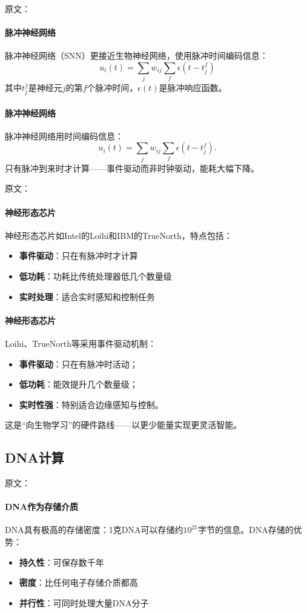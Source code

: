 原文：
\paragraph{脉冲神经网络}
脉冲神经网络（SNN）更接近生物神经网络，使用脉冲时间编码信息：
$$u_i(t) = \sum_j w_{ij} \sum_f \epsilon(t - t_j^f)$$
其中$t_j^f$是神经元$j$的第$f$个脉冲时间，$\epsilon(t)$是脉冲响应函数。
\paragraph{脉冲神经网络}
脉冲神经网络用时间编码信息：
$$u_i(t)=\sum_jw_{ij}\sum_f\epsilon(t-t_j^f).$$
只有脉冲到来时才计算——\;事件驱动而非时钟驱动，能耗大幅下降。

原文：
\paragraph{神经形态芯片}
神经形态芯片如Intel的Loihi和IBM的TrueNorth，特点包括：
\begin{itemize}
\item \textbf{事件驱动}：只在有脉冲时才计算
\item \textbf{低功耗}：功耗比传统处理器低几个数量级
\item \textbf{实时处理}：适合实时感知和控制任务
\end{itemize}
\paragraph{神经形态芯片}
Loihi、TrueNorth等采用事件驱动机制：  
\begin{itemize}
\item \textbf{事件驱动}：只在有脉冲时活动；
\item \textbf{低功耗}：能效提升几个数量级；
\item \textbf{实时性强}：特别适合边缘感知与控制。
\end{itemize}
这是“向生物学习”的硬件路线——\;以更少能量实现更灵活智能。

\subsection{DNA计算}

原文：
\paragraph{DNA作为存储介质}
DNA具有极高的存储密度：1克DNA可以存储约$10^{21}$字节的信息。DNA存储的优势：
\begin{itemize}
\item \textbf{持久性}：可保存数千年
\item \textbf{密度}：比任何电子存储介质都高
\item \textbf{并行性}：可同时处理大量DNA分子
\end{itemize}
